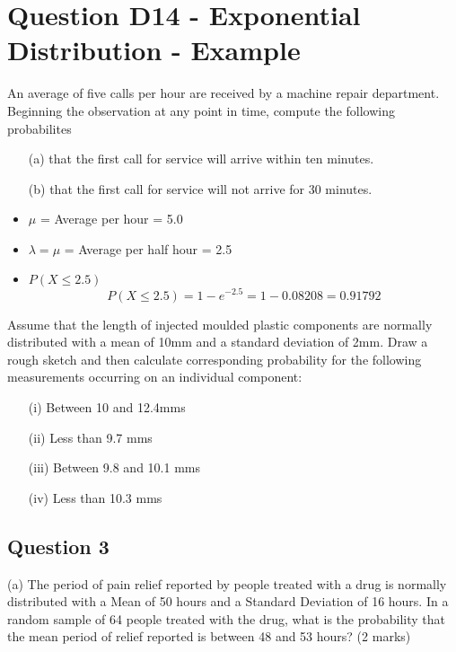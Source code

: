 \documentclass[]{report}
\begin{document}
\section*{Question D14 - Exponential Distribution - Example}

An average of five calls per hour are received by a machine repair department. 
Beginning the observation at any point in time, compute the following probabilites

\begin{itemize} 
	\item[(a)] that the first call 
	for service will arrive within ten minutes.
	\item[(b)] that the first call 
	for service will not arrive for 30 minutes.
\end{itemize}

\begin{itemize}
	\item $\mu$ = Average per hour = 5.0
	\item $\lambda= \mu$ = Average per half hour = 2.5
	\item $P(X \leq 2.5) $
	\[P(X \leq 2.5) = 1 - e^{-2.5} = 1 - 0.08208 = 0.91792\]
\end{itemize}



Assume that the length of injected moulded plastic components are normally distributed with a mean of 10mm and a standard deviation of 2mm.  
Draw a rough sketch and then calculate corresponding probability for the following measurements occurring on an individual component:

\begin{itemize} 
	\item[(i)]	Between 10 and 12.4mms
	\item[(ii)]	Less than 9.7 mms
	\item[(iii)]	Between 9.8 and 10.1 mms
	\item[(iv)]	Less than 10.3 mms
\end{itemize}


\subsection{Question 3}
(a) 	The period of pain relief reported by people treated with a drug is normally distributed with a Mean of 50 hours and a Standard Deviation of 16 hours.  In a random sample of 64 people treated with the drug, what is the probability that the mean period of relief reported is between 48 and 53 hours?
(2 marks)
\end{document}
